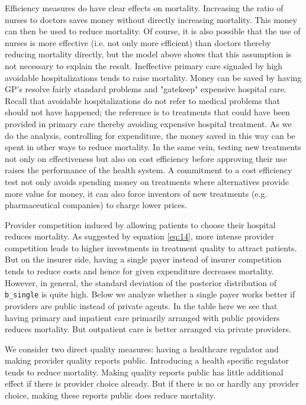 \documentclass{article}
\begin{document}
Efficiency measures do have clear effects on mortality. Increasing the ratio of nurses to doctors saves money without directly increasing mortality. This money can then be used to reduce mortality. Of course, it is also possible that the use of nurses is more effective (i.e. not only more efficient) than doctors thereby reducing mortality directly, but the model above shows that this assumption is not necessary to explain the result. Ineffective primary care signaled by high avoidable hospitalizations tends to raise mortality. Money can be saved by having GP's resolve fairly standard problems and "gatekeep" expensive hospital care. Recall that avoidable hospitalizations do not refer to medical problems that should not have happened; the reference is to treatments that could have been provided in primary care thereby avoiding expensive hospital treatment. As we do the analysis, controlling for expenditure, the money saved in this way can be spent in other ways to reduce mortality. In the same vein, testing new treatments not only on effectiveness but also on cost efficiency before approving their use raises the performance of the health system. A commitment to a cost efficiency test not only avoids spending money on treatments where alternatives provide more value for money, it can also force inventors of new treatments (e.g. pharmaceutical companies) to charge lower prices.

Provider competition induced by allowing patients to choose their hospital reduces mortality. As suggested by equation \eqref{eq:14}, more intense provider competition leads to higher investments in treatment quality to attract patients. But on the insurer side, having a single payer instead of insurer competition tends to reduce costs and hence for given expenditure decreases mortality. However, in general, the standard deviation of the posterior distribution of \texttt{b\_single} is quite high. Below we analyze whether a single payer works better if providers are public instead of private agents. In the table here we see that having primary and inpatient care primarily arranged with public providers reduces mortality. But outpatient care is better arranged via private providers.

We consider two direct quality measures: having a healthcare regulator and making provider quality reports public. Introducing a health specific regulator tends to reduce mortality. Making quality reports public has little additional effect if there is provider choice already. But if there is no or hardly any provider choice, making these reports public does reduce mortality.
\end{document}
